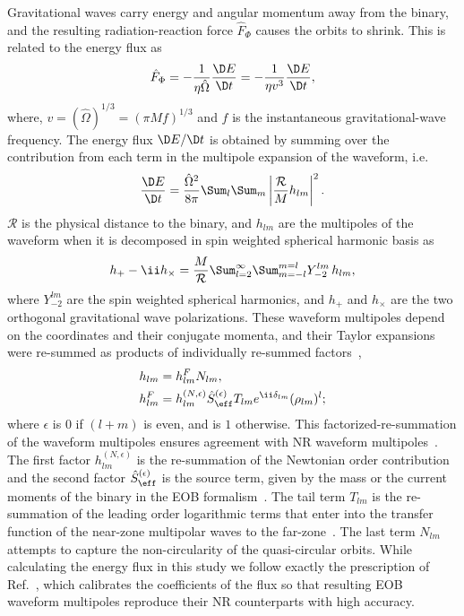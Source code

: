 Gravitational waves carry energy and angular momentum away from the binary,
and the resulting radiation-reaction force $\hat{F}_{\Phi}$ causes the orbits
to shrink. This is related to the energy flux as 
\begin{equation}
\hat{F}_{\Phi} = -\dfrac{1}{\eta \hat{\Omega}} \dfrac{\D E}{\D t} = -\dfrac{1}{\eta v^3} \dfrac{\D E}{\D t},
\end{equation}
where, $v=(\hat{\Omega})^{1/3}=(\pi Mf)^{1/3}$ and $f$ is the instantaneous
gravitational-wave frequency. The energy flux $\D E/\D t$ is obtained by
summing over the contribution from each term in the multipole expansion of the
waveform, i.e. 
\begin{equation}
\frac{\D E}{\D t} = \frac{\hat{\Omega}^2}{8\pi} \Sum_{l}\Sum_{m} \left|\frac{\mathcal{R}}{M} h_{lm}\right|^2.
\end{equation}
$\mathcal{R}$ is the physical distance to the binary, and $h_{lm}$ are
the multipoles of the waveform when it is decomposed in spin weighted
spherical harmonic basis as
\begin{equation}
h_+ - \ii h_{\times} = \dfrac{M}{\mathcal{R}} \Sum^{\infty}_{l=2} \Sum^{m=l}_{m = -l} Y^{lm}_{-2}\, h_{lm},
\end{equation}
where $Y^{lm}_{-2}$ are the spin weighted spherical harmonics, and $h_+$ and
$h_{\times}$ are the two orthogonal gravitational wave polarizations. These
waveform multipoles depend on the coordinates and their conjugate momenta, and
their Taylor expansions were re-summed as products of individually re-summed
factors~\citep{DamourFluxhlm01}, 
\begin{subequations}\label{eq:hlmdef}
\begin{align}
h_{lm} &= h^F_{lm} N_{lm}\label{eq:hNQC},\\
h^F_{lm} &= h^{(N,\epsilon)}_{lm} \hat{S}_{\eff}^{(\epsilon)} T_{lm} e^{\ii\delta_{lm}} (\rho_{lm})^l\label{eq:hNoNQC};
\end{align}
\end{subequations}
where $\epsilon$ is $0$ if $\left( l+m\right)$ is even, and is $1$ otherwise. This
factorized-re-summation of the waveform multipoles ensures agreement with NR
waveform multipoles~\citep{EOBNRdevel01,EOBNRdevel02,EOBNR01}.  The first
factor $h^{(N,\epsilon)}_{lm}$ is the re-summation of the Newtonian order
contribution and the second factor  $\hat{S}_{\eff}^{(\epsilon)}$ is the
source term, given by the mass or the current moments of the binary in the EOB
formalism~\citep{DamourFluxhlm01,BuonannoEOBTerms}. The tail term $T_{lm}$ is
the re-summation of the leading order logarithmic terms that enter into the
transfer function of the near-zone multipolar waves to the
far-zone~\citep{BuonannoEOBTerms}. The last term $N_{lm}$ attempts to capture
the non-circularity of the quasi-circular orbits.  While calculating the
energy flux in this study we follow exactly the prescription of
Ref.~\citep{BuonannoEOBv2Main}, which calibrates the coefficients of the flux
so that resulting EOB waveform multipoles reproduce their NR counterparts with
high accuracy.

